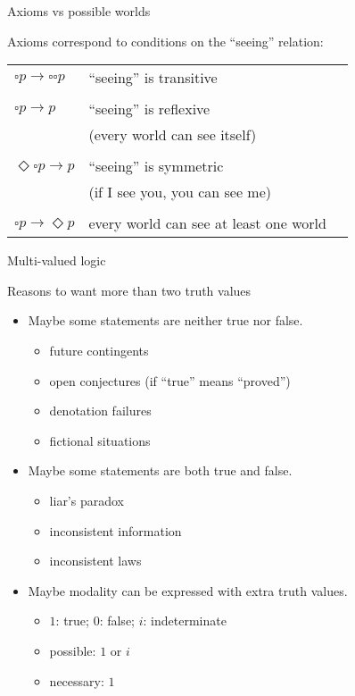 \documentclass{beamer}
\newcommand{\nec}{\square}
\newcommand{\poss}{\Diamond}
\newcommand{\sect}[1]{\begin{frame}\centerline{\large #1}\end{frame}}
\begin{document}
\begin{frame}{Axioms vs possible worlds}

Axioms correspond to conditions on the ``seeing'' relation:

\vfill

\begin{tabular}{lll}
$\nec p \to \nec\nec p$ & ``seeing'' is transitive \\
\\
$\nec p \to p$ & ``seeing'' is reflexive \\
    & (every world can see itself) \\
\\
$\poss\nec p \to p$ & ``seeing'' is symmetric \\
    & (if I see you, you can see me) \\
\\
$\nec p \to \poss p$
    & every world can see at least one world
\end{tabular}

\end{frame}

\sect{Multi-valued logic}

\begin{frame}{Reasons to want more than two truth values}
\begin{itemize}
\item Maybe some statements are neither true nor false.
    \begin{itemize}
    \item future contingents
    \item open conjectures (if ``true'' means ``proved'')
    \item denotation failures
    \item fictional situations
    \end{itemize}
\item Maybe some statements are both true and false.
    \begin{itemize}
    \item liar's paradox
    \item inconsistent information
    \item inconsistent laws
    \end{itemize}
\item Maybe modality can be expressed with extra truth values.
    \begin{itemize}
    \item $1$: true; $0$: false; $i$: indeterminate
    \item possible: $1$ or $i$
    \item necessary: $1$
    \end{itemize}
\end{itemize}
\end{frame}
\end{document}
